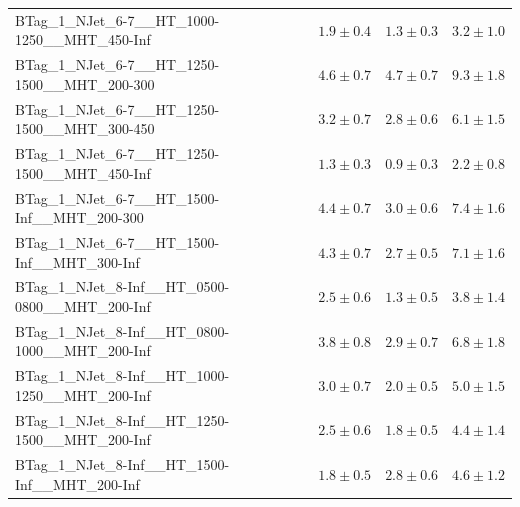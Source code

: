 \documentclass{beamer}
\begin{document}
\begin{frame}
\begin{tabular}{lrrr}
      BTag\_1\_NJet\_6-7\_\_HT\_1000-1250\_\_MHT\_450-Inf &               $1.9\pm0.4$&               $1.3\pm0.3$&                   $3.2\pm1.0$ \\ 
      BTag\_1\_NJet\_6-7\_\_HT\_1250-1500\_\_MHT\_200-300 &               $4.6\pm0.7$&               $4.7\pm0.7$&                   $9.3\pm1.8$ \\ 
      BTag\_1\_NJet\_6-7\_\_HT\_1250-1500\_\_MHT\_300-450 &               $3.2\pm0.7$&               $2.8\pm0.6$&                   $6.1\pm1.5$ \\ 
      BTag\_1\_NJet\_6-7\_\_HT\_1250-1500\_\_MHT\_450-Inf &               $1.3\pm0.3$&               $0.9\pm0.3$&                   $2.2\pm0.8$ \\ 
       BTag\_1\_NJet\_6-7\_\_HT\_1500-Inf\_\_MHT\_200-300 &               $4.4\pm0.7$&               $3.0\pm0.6$&                   $7.4\pm1.6$ \\ 
       BTag\_1\_NJet\_6-7\_\_HT\_1500-Inf\_\_MHT\_300-Inf &               $4.3\pm0.7$&               $2.7\pm0.5$&                   $7.1\pm1.6$ \\ 
    BTag\_1\_NJet\_8-Inf\_\_HT\_0500-0800\_\_MHT\_200-Inf &               $2.5\pm0.6$&               $1.3\pm0.5$&                   $3.8\pm1.4$ \\ 
    BTag\_1\_NJet\_8-Inf\_\_HT\_0800-1000\_\_MHT\_200-Inf &               $3.8\pm0.8$&               $2.9\pm0.7$&                   $6.8\pm1.8$ \\ 
    BTag\_1\_NJet\_8-Inf\_\_HT\_1000-1250\_\_MHT\_200-Inf &               $3.0\pm0.7$&               $2.0\pm0.5$&                   $5.0\pm1.5$ \\ 
    BTag\_1\_NJet\_8-Inf\_\_HT\_1250-1500\_\_MHT\_200-Inf &               $2.5\pm0.6$&               $1.8\pm0.5$&                   $4.4\pm1.4$ \\ 
     BTag\_1\_NJet\_8-Inf\_\_HT\_1500-Inf\_\_MHT\_200-Inf &               $1.8\pm0.5$&               $2.8\pm0.6$&                   $4.6\pm1.2$ \\ 

\bottomrule 
\end{tabular}
\end{frame}
\end{document}
